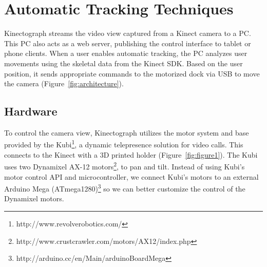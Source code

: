 \section{Automatic Tracking Techniques}
\label{kinectograph_tracking}

Kinectograph streams the video view captured from a Kinect camera to a PC. This PC also acts as a web server, publishing the control interface to tablet or phone clients. When a user enables automatic tracking, the PC analyzes user movements using the skeletal data from the Kinect SDK. Based on the user position, it sends appropriate commands to the motorized dock via USB to move the camera (Figure~\ref{fig:architecture}).

\subsection{Hardware}
To control the camera view, Kinectograph utilizes the motor system and base provided by the Kubi\footnote{http://www.revolverobotics.com/}, a dynamic telepresence solution for video calls. This connects to the Kinect with a 3D printed holder (Figure~\ref{fig:figure1}). The Kubi uses two Dynamixel AX-12 motors\footnote{http://www.crustcrawler.com/motors/AX12/index.php}, to pan and tilt. Instead of using Kubi's motor control API and microcontroller, we connect Kubi's motors to an external Arduino Mega (ATmega1280)\footnote{http://arduino.cc/en/Main/arduinoBoardMega} so we can better customize the control of the Dynamixel motors.



